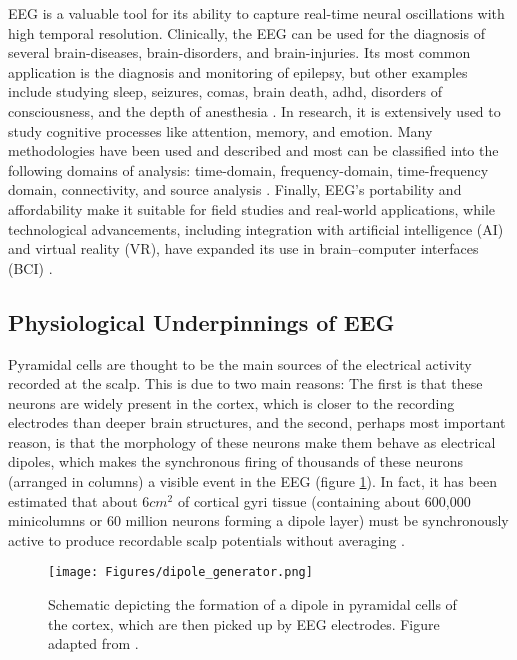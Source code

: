 EEG is a valuable tool for its ability to capture real-time neural oscillations with high temporal resolution. Clinically, the EEG can be used for the diagnosis of several brain-diseases, brain-disorders, and brain-injuries. Its most common application is the diagnosis and monitoring of epilepsy, but other examples include studying sleep, seizures, comas, brain death, \acrfull{adhd}, disorders of consciousness, and the depth of anesthesia \cite{amerEEGSignalProcessing2023}. In research, it is extensively used to study cognitive processes like attention, memory, and emotion. Many methodologies have been used and described and most can be classified into the following domains of analysis: time-domain, frequency-domain, time-frequency domain, connectivity, and source analysis \cite{michelUtilizationEEGBrain2012,Subha2010EEGSA, cohenAnalyzingNeuralTime2014}. Finally, EEG's portability and affordability make it suitable for field studies and real-world applications, while technological advancements, including integration with artificial intelligence (AI) and virtual reality (VR), have expanded its use in brain–computer interfaces (BCI) \cite{mushtaqOneHundredYears2024}.

\subsection{Physiological Underpinnings of EEG}

Pyramidal cells are thought to be the main sources of the electrical activity recorded at the scalp. This is due to two main reasons: The first is that these neurons are widely present in the cortex, which is closer to the recording electrodes than deeper brain structures, and the second, perhaps most important reason, is that the morphology of these neurons make them behave as electrical dipoles, which makes the synchronous firing of thousands of these neurons (arranged in columns) a visible event in the EEG (figure \ref{fig:dip_generator}). In fact, it has been estimated that about $6 cm^2$ of cortical gyri tissue (containing about 600,000 minicolumns or 60 million neurons forming a dipole layer) must be synchronously active to produce recordable scalp potentials without averaging \cite{nunezElectricFieldsBrain2006}. 

\begin{figure}[H]
	\centering
	\texttt{[image: Figures/dipole\_generator.png]}
	\caption{Schematic depicting the formation of a dipole in pyramidal cells of the cortex, which are then picked up by EEG electrodes. Figure adapted from \cite{bearNeuroscienceExploringBrain2020}. \label{fig:dip_generator}}
\end{figure}

